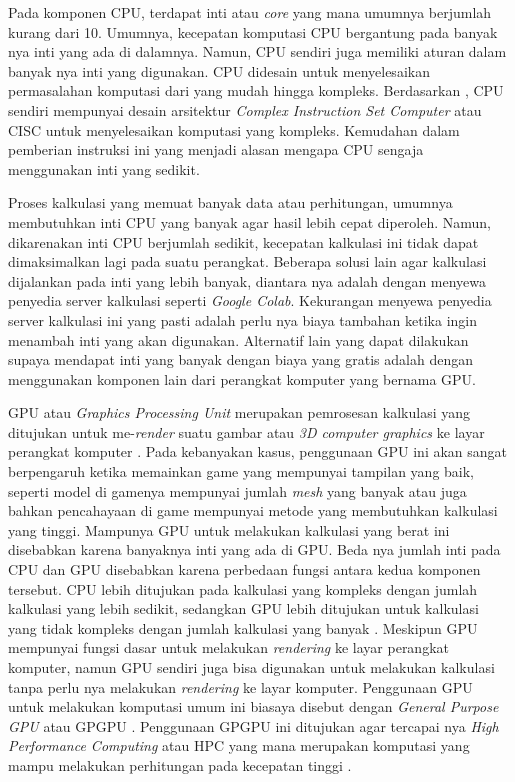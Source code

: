 
Pada komponen CPU, terdapat inti atau \emph{core} yang mana umumnya berjumlah
kurang dari 10. Umumnya, kecepatan komputasi CPU bergantung pada banyak nya inti
yang ada di dalamnya. Namun, CPU sendiri juga memiliki aturan dalam banyak nya inti
yang digunakan. CPU didesain untuk menyelesaikan permasalahan komputasi dari
yang mudah hingga kompleks. Berdasarkan \cite{kukunasChapterIntelPentium2015},
CPU sendiri mempunyai desain arsitektur \emph{Complex Instruction Set Computer} atau
CISC untuk menyelesaikan komputasi yang kompleks. Kemudahan dalam pemberian
instruksi ini yang menjadi alasan mengapa CPU sengaja menggunakan inti yang
sedikit.

Proses kalkulasi yang memuat banyak data atau perhitungan, umumnya membutuhkan inti
CPU yang banyak agar hasil lebih cepat diperoleh. Namun, dikarenakan inti CPU berjumlah
sedikit, kecepatan kalkulasi ini tidak dapat dimaksimalkan lagi pada suatu
perangkat. Beberapa solusi lain agar kalkulasi dijalankan pada inti yang lebih banyak,
diantara nya adalah dengan menyewa penyedia server kalkulasi seperti \emph{Google
Colab}. Kekurangan menyewa penyedia server kalkulasi ini yang pasti adalah perlu
nya biaya tambahan ketika ingin menambah inti yang akan digunakan. Alternatif lain
yang dapat dilakukan supaya mendapat inti yang banyak dengan biaya yang gratis adalah
dengan menggunakan komponen lain dari perangkat komputer yang bernama GPU.


GPU atau \emph{Graphics Processing Unit} merupakan pemrosesan kalkulasi yang ditujukan
untuk me-\emph{render} suatu gambar atau \emph{3D computer graphics} ke layar perangkat
komputer \citep{armWhatGraphicsProcessing2023}. Pada kebanyakan kasus,
penggunaan GPU ini akan sangat berpengaruh ketika memainkan game yang mempunyai
tampilan yang baik, seperti model di gamenya mempunyai jumlah \emph{mesh} yang
banyak atau juga bahkan pencahayaan di game mempunyai metode yang membutuhkan
kalkulasi yang tinggi. Mampunya GPU untuk melakukan kalkulasi yang berat ini disebabkan
karena banyaknya inti yang ada di GPU. Beda nya jumlah inti pada CPU dan GPU
disebabkan karena perbedaan fungsi antara kedua komponen tersebut. CPU lebih ditujukan
pada kalkulasi yang kompleks dengan jumlah kalkulasi yang lebih sedikit,
sedangkan GPU lebih ditujukan untuk kalkulasi yang tidak kompleks dengan jumlah
kalkulasi yang banyak \citep{intelCPUVsGPU2023}. Meskipun GPU mempunyai fungsi
dasar untuk melakukan \emph{rendering} ke layar perangkat komputer, namun GPU
sendiri juga bisa digunakan untuk melakukan kalkulasi tanpa perlu nya melakukan
\emph{rendering} ke layar komputer. Penggunaan GPU untuk melakukan komputasi
umum ini biasaya disebut dengan \emph{General Purpose GPU} atau GPGPU \citep{gigabyteWhatGPGPUWhy2023}.
Penggunaan GPGPU ini ditujukan agar tercapai nya \emph{High Performance
Computing} atau HPC yang mana merupakan komputasi yang mampu melakukan
perhitungan pada kecepatan tinggi \citep{gigabyteHPCHighPerformance2023}.

